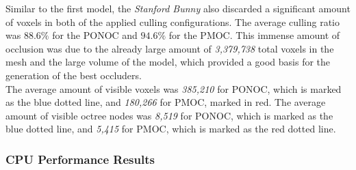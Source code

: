 \noindent
Similar to the first model, the \emph{Stanford Bunny} also discarded a significant amount of 
voxels in both of the applied culling configurations. The average culling ratio was $88.6\%$ 
for the \ac{PONOC} and $94.6\%$ for the \ac{PMOC}. This immense 
amount of occlusion was due to the already large amount of \emph{3,379,738} total voxels in the 
mesh and the large volume of the model, which provided a good basis for the generation of the 
best occluders. \\


\noindent
The average amount of visible voxels was \emph{385,210} for \ac{PONOC}, which is 
marked as the blue dotted line, and \emph{180,266} for \ac{PMOC}, marked in red.
The average amount of visible octree nodes was \emph{8,519} for \ac{PONOC}, which 
is marked as the blue dotted line, and \emph{5,415} for \ac{PMOC}, which is marked
as the red dotted line.

\subsubsection*{CPU Performance Results} \label{subsubsec-cpu-performance-results-bunny}

